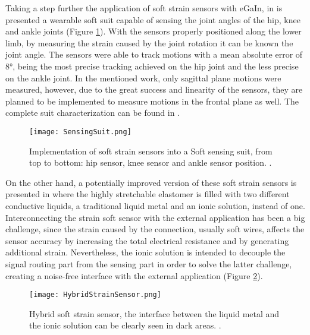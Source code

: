 Taking a step further the application of soft strain sensors with eGaIn, in \cite{mengucc2013soft} is presented a wearable soft suit capable of sensing the joint angles of the hip, knee and ankle joints (Figure \ref{fig:Sensing_suit}). With the sensors properly positioned along the lower limb, by measuring the strain caused by the joint rotation it can be known the joint angle. The sensors were able to track motions with a mean absolute error of 8°, being the most precise tracking achieved on the hip joint and the less precise on the ankle joint. In the mentioned work, only sagittal plane motions were measured, however, due to the great success and linearity of the sensors, they are planned to be implemented to measure motions in the frontal plane as well. The complete suit characterization can be found in \cite{mengucc2014wearable}.

\begin{figure}[hb!]
    \centering
    \texttt{[image: SensingSuit.png]}
    \caption{Implementation of soft strain sensors into a Soft sensing suit, from top to bottom: hip sensor, knee sensor and ankle sensor position. \cite{mengucc2013soft}. }
    \label{fig:Sensing_suit}
\end{figure}

On the other hand, a potentially improved version of these soft strain sensors is presented in \cite{Chossat2013} where the highly stretchable elastomer is filled with two different conductive liquids, a traditional liquid metal and an ionic solution, instead of one. Interconnecting the strain soft sensor with the external application has been a big challenge, since the strain caused by the connection, usually soft wires, affects the sensor accuracy by increasing the total electrical resistance and by generating additional strain. Nevertheless, the ionic solution is intended to decouple the signal routing part from the sensing part in order to solve the latter challenge, creating a noise-free interface with the external application (Figure \ref{fig:hybrid_strain_sensor}).

\begin{figure}[hb!]
    \centering
    \texttt{[image: HybridStrainSensor.png]}
    \caption{Hybrid soft strain sensor, the interface between the liquid metal and the ionic solution can be clearly seen in dark areas. \cite{Chossat2013}. }
    \label{fig:hybrid_strain_sensor}
\end{figure}

